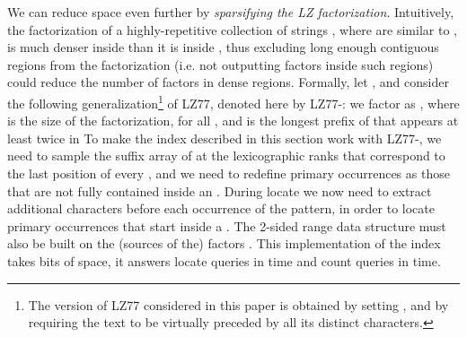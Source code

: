 \documentclass[a4paper,UKenglish]{lipics-v2016}
\begin{document}
We can reduce space even further by \emph{sparsifying the LZ factorization}. 
Intuitively, the factorization of a highly-repetitive collection of strings , where  are similar to , is much denser inside  than it is inside , thus excluding long enough contiguous regions from the factorization (i.e. not outputting factors inside such regions) could reduce the number of factors in dense regions. Formally, let , and consider the following generalization\footnote{The version of LZ77 considered in this paper is obtained by setting , and by requiring the text to be virtually preceded by all its distinct characters.} of LZ77, denoted here by LZ77-: we factor  as , where  is the size of the factorization,  for all , and  is the longest prefix of  that appears at least twice in  To make the index described in this section work with LZ77-, we need to sample the suffix array of  at the lexicographic ranks that correspond to the last position of every , and we need to redefine primary occurrences as those that are not fully contained inside an . During locate we now need to extract  additional characters before each occurrence of the pattern, in order to locate primary occurrences that start inside a . The 2-sided range data structure must also be built on the (sources of the) factors . This implementation of the index takes  bits of space, it answers locate queries in  time and count queries in  time.
\end{document}
